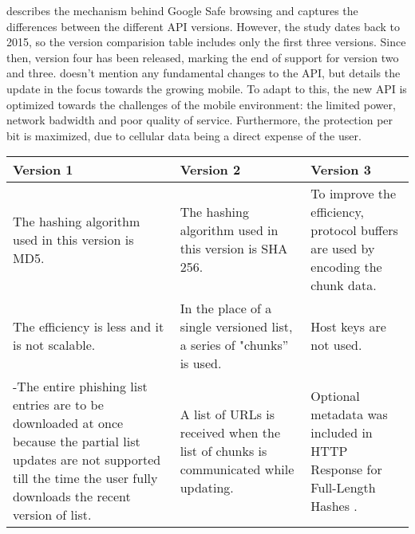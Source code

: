 \cite{GOOGLE_SAFE_BROWSING_VERSIONS} describes the mechanism behind Google Safe browsing and captures the differences between the different API versions. However, the study dates back to 2015, so the version comparision table includes only the first three versions. Since then, version four has been released, marking the end of support for version two and three.
\cite{GOOGLE_SAFE_BROWSING_V4} doesn't mention any fundamental changes to the API, but details the update in the focus towards the growing mobile. To adapt to this, the new API is optimized towards the challenges of the mobile environment: the limited power, network badwidth and poor quality of service. Furthermore, the protection per bit is maximized, due to cellular data being a direct expense of the user.

\begin{singlespace}
	\small
	\begin{center}
		\label{tab:OPTIMISED_MODELS}
		\begin{tabular}{ | m{13em} | m{13em} | m{13em} | }
			\hline
			\textbf{Version 1}                     &
			\textbf{Version 2}                     &
			\textbf{Version 3}                                                                                                                     \\
			\hline
			The hashing algorithm used in this
			version is MD5.                        & The hashing algorithm used in this
			version is SHA 256.                    & To improve the efficiency, protocol buffers are
			used by encoding the chunk data.                                                                                                       \\
			\hline
			The efficiency is less and it is not
			scalable.                              & In the place of a single versioned
			list, a series of "chunks” is used.    & Host keys are not used.                                                                       \\
			\hline
			-The entire phishing list entries are to be
			downloaded at once because the
			partial list updates are not supported
			till the time the user fully downloads
			the recent version of list.            & A list of URLs is received when the
			list of chunks is communicated
			while updating.                        & Optional metadata was included in HTTP
			Response for Full-Length Hashes .                                                                                                      \\

\end{tabular}
\end{center}
\end{singlespace}
